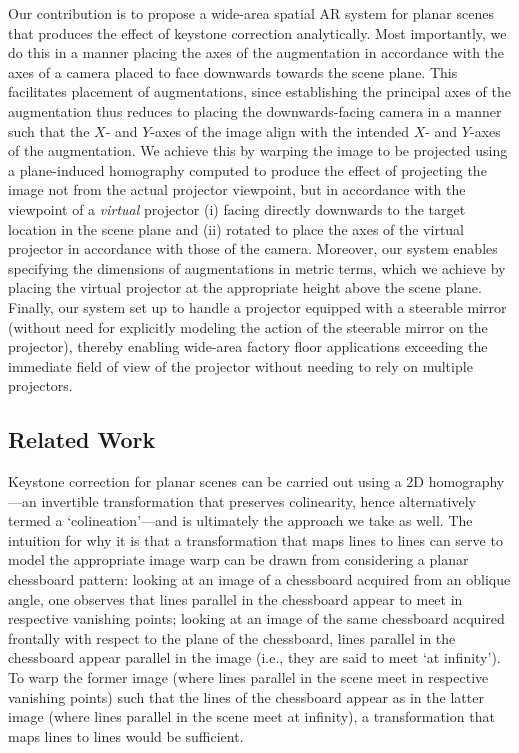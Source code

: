 \documentclass[review]{elsarticle}
\begin{document}
Our contribution is to propose a wide-area spatial AR system for planar scenes that produces the effect of keystone correction analytically. Most importantly, we do this in a manner placing the axes of the augmentation in accordance with the axes of a camera placed to face downwards towards the scene plane. This facilitates placement of augmentations, since establishing the principal axes of the augmentation thus reduces to placing the downwards-facing camera in a manner such that the $X$- and $Y$-axes of the image align with the intended $X$- and $Y$-axes of the augmentation. We achieve this by warping the image to be projected using a plane-induced homography computed to produce the effect of projecting the image not from the actual projector viewpoint, but in accordance with the viewpoint of a \textit{virtual} projector (i) facing directly downwards to the target location in the scene plane and (ii) rotated to place the axes of the virtual projector in accordance with those of the camera. Moreover, our system enables specifying the dimensions of augmentations in metric terms, which we achieve by placing the virtual projector at the appropriate height above the scene plane. Finally, our system set up to handle a projector equipped with a steerable mirror (without need for explicitly modeling the action of the steerable mirror on the projector), thereby enabling wide-area factory floor applications exceeding the immediate field of view of the projector without needing to rely on multiple projectors.

\subsection{Related Work}

Keystone correction for planar scenes can be carried out using a 2D homography \cite{Hartley2004}---an invertible transformation that preserves colinearity, hence alternatively termed a `colineation'---and is ultimately the approach we take as well. The intuition for why it is that a transformation that maps lines to lines can serve to model the appropriate image warp can be drawn from considering a planar chessboard pattern: looking at an image of a chessboard acquired from an oblique angle, one observes that lines parallel in the chessboard appear to meet in respective vanishing points; looking at an image of the same chessboard acquired frontally with respect to the plane of the chessboard, lines parallel in the chessboard appear parallel in the image (i.e., they are said to meet `at infinity'). To warp the former image (where lines parallel in the scene meet in respective vanishing points) such that the lines of the chessboard appear as in the latter image (where lines parallel in the scene meet at infinity), a transformation that maps lines to lines would be sufficient.
\end{document}

